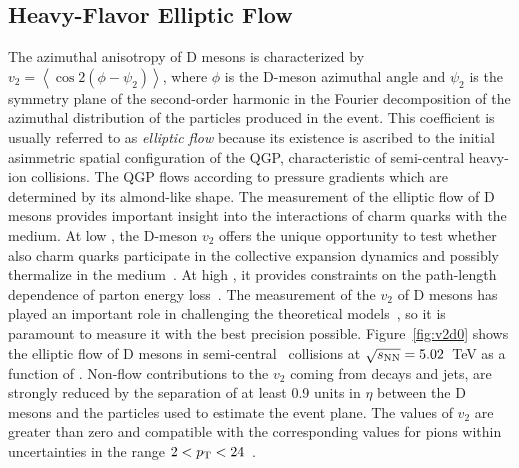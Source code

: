\documentclass[10pt]{article}
\begin{document}
\subsection{Heavy-Flavor Elliptic Flow}
The azimuthal anisotropy of D mesons is characterized by $v_2= \left<\cos 2(\phi - \psi_2)\right>$, where $\phi$ is the D-meson azimuthal angle and $\psi_2$ is the symmetry plane of the second-order
harmonic in the Fourier decomposition of the azimuthal distribution of the particles produced in the event.
This coefficient is usually referred to as \emph{elliptic flow} because its existence is ascribed to the initial asimmetric spatial configuration of the QGP, characteristic of semi-central heavy-ion collisions.
The QGP flows according to pressure gradients which are determined by its almond-like shape.
The measurement of the elliptic flow of D mesons provides important insight into the interactions of charm quarks with the
medium. At low \pt, the D-meson $v_2$ offers the unique opportunity to test whether also charm quarks participate in
the collective expansion dynamics and possibly thermalize in the medium~\cite{Greco:2003}. At high \pt, it provides constraints on the path-length dependence of parton energy loss~\cite{Gyulassy:2000}.
The measurement of the $v_2$ of D mesons has played an important role in challenging
the theoretical models~\cite{Das:2015}, so it is paramount to measure it with the best precision possible.
Figure~\ref{fig:v2d0} shows the elliptic flow of D mesons in semi-central \PbPb\ collisions at $\sqrt{s_{\rm NN}}=5.02$~TeV as a function of \pt.
Non-flow contributions to the $v_2$ coming from decays and jets, are strongly
reduced by the separation of at least 0.9 units in $\eta$ between the D mesons and the particles used
to estimate the event plane. 
The values of $v_2$ are greater than zero and compatible with the corresponding values for pions within uncertainties in the range $2<p_{\rm T}<24$~\GeVc.
\end{document}
